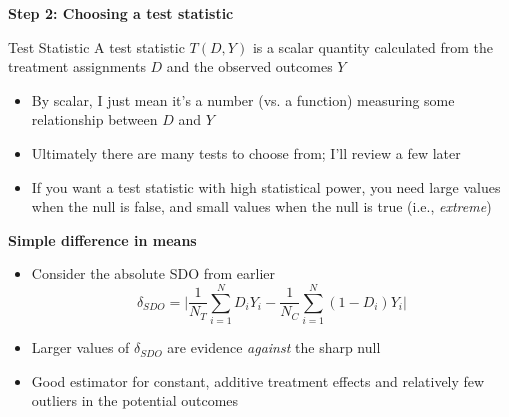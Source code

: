 \documentclass[notes=show]{beamer}
\begin{document}
\begin{frame}[plain]
\begin{center}
\textbf{Step 2: Choosing a test statistic}
\end{center}

\begin{block}{Test Statistic}
A test statistic $T(D,Y)$ is a scalar quantity calculated from the treatment assignments  $D$ and the observed outcomes $Y$ 
\end{block}

\begin{itemize}
\item By scalar, I just mean it's a number (vs. a function) measuring some relationship between $D$ and $Y$
\item Ultimately there are many tests to choose from; I'll review a few later
\item If you want a test statistic with high statistical power, you need large values when the null is false, and small values when the null is true (i.e., \emph{extreme})
\end{itemize}

\end{frame}

\begin{frame}[plain]
\begin{center}
\textbf{Simple difference in means}
\end{center}

\begin{itemize}
\item Consider the absolute SDO from earlier $$ \delta_{SDO} = \bigg | \frac{1}{N_T} \sum_{i=1}^N D_iY_i - \frac{1}{N_C} \sum_{i=1}^N (1-D_i)Y_i \bigg |$$
\item Larger values of $\delta_{SDO}$ are evidence \emph{against} the sharp null
\item Good estimator for constant, additive treatment effects and relatively few outliers in the potential outcomes
\end{itemize}

\end{frame}
\end{document}
